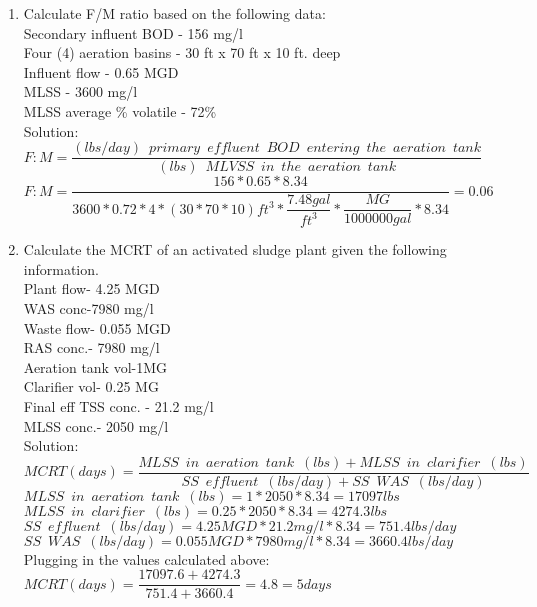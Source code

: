 \documentclass{article}
\begin{document}
\begin{enumerate}
\item Calculate F/M ratio based on the following data:\\
Secondary influent BOD - 156 mg/l\\
Four (4) aeration basins - 30 ft x 70 ft x 10 ft. deep\\
Influent flow - 0.65 MGD\\
MLSS - 3600 mg/l\\
MLSS average \% volatile - 72\%\\
Solution:\\
\vspace{0.3cm}
$F:M=\dfrac{(lbs/day) \enspace primary \enspace effluent  \enspace BOD \enspace entering \enspace the  \enspace aeration \enspace tank}{(lbs) \enspace MLVSS \enspace in \enspace the  \enspace aeration \enspace tank}$\\
\vspace{0.3cm}
$F:M=\dfrac{156*0.65*8.34}{3600*0.72*4*(30*70*10)ft^3* \dfrac{7.48gal}{ft^3}*\dfrac{MG}{1000000gal}*8.34}=\boxed{0.06}$\\

\item Calculate the MCRT of an activated sludge plant given the following information.\\
Plant flow- 4.25 MGD\\
WAS conc-7980 mg/l\\
Waste flow- 0.055 MGD\\
RAS conc.- 7980 mg/l\\
Aeration tank vol-1MG\\  
Clarifier vol- 0.25 MG\\
Final eff TSS conc. - 21.2 mg/l\\
MLSS conc.- 2050 mg/l\\
\vspace{0.3cm}
Solution:\\
\vspace{0.3cm}
$MCRT (days) =  \dfrac{MLSS \enspace in \enspace aeration \enspace tank \enspace (lbs)+MLSS \enspace in \enspace clarifier \enspace (lbs)}{SS \enspace effluent \enspace (lbs/day)+SS \enspace WAS \enspace (lbs/day)}$\\
\vspace{0.3cm} 
$MLSS \enspace in \enspace aeration \enspace tank \enspace (lbs)=1*2050*8.34=17097lbs$\\
\vspace{0.3cm} 
$MLSS \enspace in \enspace clarifier \enspace (lbs)=0.25*2050*8.34=4274.3lbs$\\
\vspace{0.3cm} 
$SS \enspace effluent \enspace (lbs/day)=4.25MGD *21.2mg/l*8.34=751.4lbs/day$\\
\vspace{0.3cm} 
$SS \enspace WAS \enspace (lbs/day)=0.055MGD *7980mg/l*8.34=3660.4lbs/day$\\
\vspace{0.3cm} 
Plugging in the values calculated above: $MCRT (days) =  \dfrac{17097.6+4274.3}{751.4+3660.4}=4.8=\boxed{5days}$\\
\vspace{0.2cm}



\end{enumerate}
\end{document}
